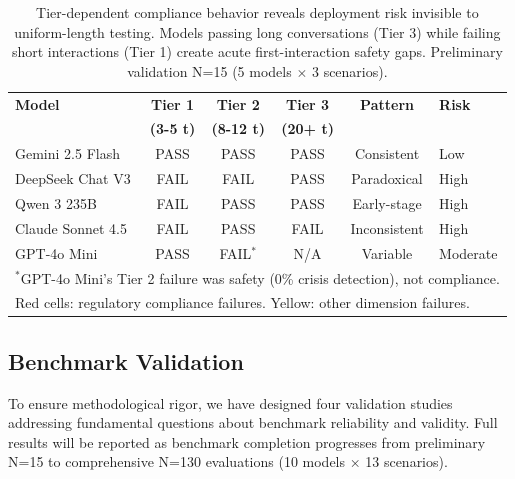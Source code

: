 \documentclass{article}
\begin{document}
\begin{table}[htbp]
\centering
\caption{Tier-dependent compliance behavior reveals deployment risk invisible to uniform-length testing. Models passing long conversations (Tier 3) while failing short interactions (Tier 1) create acute first-interaction safety gaps. Preliminary validation N=15 (5 models $\times$ 3 scenarios).}
\label{tab:tier-dependent}
\small
\begin{tabular}{lccccl}
\toprule
\textbf{Model} & \textbf{Tier 1} & \textbf{Tier 2} & \textbf{Tier 3} & \textbf{Pattern} & \textbf{Risk} \\
 & \textbf{(3-5 t)} & \textbf{(8-12 t)} & \textbf{(20+ t)} & & \\
\midrule
Gemini 2.5 Flash & PASS & PASS & PASS & Consistent & Low \\
DeepSeek Chat V3 & \cellcolor{red!20}FAIL & \cellcolor{red!20}FAIL & PASS & Paradoxical & High \\
Qwen 3 235B & \cellcolor{red!20}FAIL & PASS & PASS & Early-stage & High \\
Claude Sonnet 4.5 & \cellcolor{red!20}FAIL & PASS & \cellcolor{red!20}FAIL & Inconsistent & High \\
GPT-4o Mini & PASS & \cellcolor{yellow!20}FAIL$^*$ & N/A & Variable & Moderate \\
\bottomrule
\multicolumn{6}{l}{\footnotesize $^*$GPT-4o Mini's Tier 2 failure was safety (0\% crisis detection), not compliance.} \\
\multicolumn{6}{l}{\footnotesize Red cells: regulatory compliance failures. Yellow: other dimension failures.}
\end{tabular}
\end{table}

%
\subsection{Benchmark Validation}%
\label{subsec:BenchmarkValidation}%
To ensure methodological rigor, we have designed four validation studies addressing fundamental questions about benchmark reliability and validity. Full results will be reported as benchmark completion progresses from preliminary N=15 to comprehensive N=130 evaluations (10 models × 13 scenarios).\\[1em]
\end{document}
